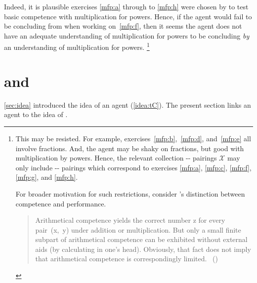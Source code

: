 \begin{note}
  Indeed, it is plausible exercises \ref{mfp:a} through to \ref{mfp:h} were chosen by \citeauthor{Gelfand:1993aa} to test basic competence with multiplication for powers.
  Hence, if the agent would fail to be concluding  from  when working on~\ref{mfp:f}, then it seems the agent does not have an adequate understanding of multiplication for powers to be concluding \emph{by} an understanding of multiplication for powers.%
  \footnote{
    This may be resisted.
    For example, exercises~\ref{mfp:b},~\ref{mfp:d}, and~\ref{mfp:e} all involve fractions.
    And, the agent may be shaky on fractions, but good with multiplication by powers.
    Hence, the relevant collection -- pairings \(\mathcal{X}\) may only include -- pairings which correspond to exercises \ref{mfp:a},  \ref{mfp:c},  \ref{mfp:f},  \ref{mfp:g}, and \ref{mfp:h}.

    For broader motivation for such restrictions, consider \citeauthor{Chomsky:2015aa}'s distinction between competence and performance.
    \begin{quote}
      Arithmetical competence yields the correct number z for every pair~(x,~y) under addition or multiplication.
      But only a small finite subpart of arithmetical competence can be exhibited without external aids (by calculating in one's head).
      Obviously, that fact does not imply that arithmetical competence is correspondingly limited.%
      \mbox{ }\hfill\mbox{(\citeyear[xii]{Chomsky:2015aa})}
    \end{quote}
  }
\end{note}



\section{ and }
\label{cha:typical:tCDef}


\begin{note}
  \autoref{sec:idea} introduced the idea of an agent \tCV{} (\autoref{idea:tC}).
  The present section links an agent \tCV{} to the idea of .
\end{note}

